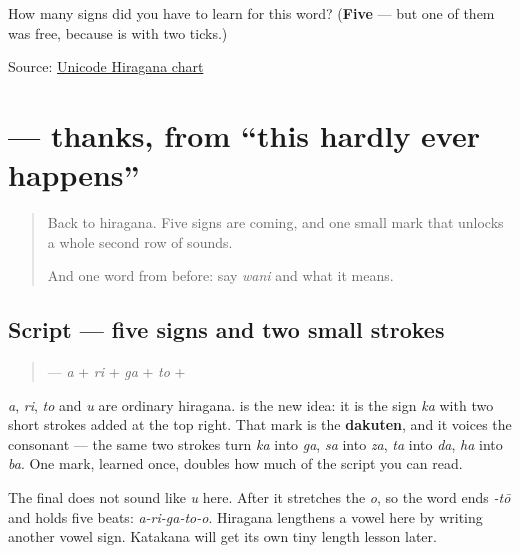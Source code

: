 \begin{tcolorbox}[breakable,colback=teal!4,colframe=teal!35!black,title={Before you move on}]
How many signs did you have to learn for this word? (\textbf{Five} — but one of them was free, because  is  with two ticks.)

Source: \href{https://www.unicode.org/charts/PDF/U3040.pdf}{Unicode Hiragana chart}
\end{tcolorbox}
\section[\texorpdfstring{\ja{ありがとう} (arigatō)}{ありがとう (arigatō)}]{ — thanks, from “this hardly ever happens”}

\label{lesson:JA-C01-arigatou}



\begin{quote}
Back to hiragana. Five signs are coming, and one small mark that unlocks a whole second row of sounds.

And one word from before: say \emph{wani} and what it means.
\end{quote}

\subsection*{Script — five signs and two small strokes}
\begin{quote}
\textbf{} — \textbf{} \emph{a} + \textbf{} \emph{ri} + \textbf{} \emph{ga} + \textbf{} \emph{to} + \textbf{}
\end{quote}

\textbf{} \emph{a}, \textbf{} \emph{ri}, \textbf{} \emph{to} and \textbf{} \emph{u} are ordinary hiragana. \textbf{} is the new idea: it is the sign \textbf{} \emph{ka} with two short strokes added at the top right. That mark is the \textbf{dakuten}, and it voices the consonant — the same two strokes turn \emph{ka} into \emph{ga}, \emph{sa} into \emph{za}, \emph{ta} into \emph{da}, \emph{ha} into \emph{ba}. One mark, learned once, doubles how much of the script you can read.

The final \textbf{} does not sound like \emph{u} here. After \textbf{} it stretches the \emph{o}, so the word ends \emph{-tō} and holds five beats: \emph{a-ri-ga-to-o}. Hiragana lengthens a vowel here by writing another vowel sign. Katakana will get its own tiny length lesson later.

